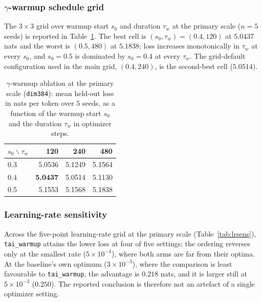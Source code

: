\documentclass[final,5p,times,twocolumn]{elsarticle}
\theoremstyle{remark}
\begin{document}
\subsubsection{$\gamma$-warmup schedule grid}

The $3 \times 3$ grid over warmup start $s_0$ and duration $\tau_w$ at the
primary scale ($n = 5$ seeds) is reported in Table~\ref{tab:warmupgrid}.
The best cell is $(s_0, \tau_w) = (0.4, 120)$ at $5.0437$ nats and the worst
is $(0.5, 480)$ at $5.1838$; loss increases monotonically in $\tau_w$ at every
$s_0$, and $s_0 = 0.5$ is dominated by $s_0 = 0.4$ at every $\tau_w$. The
grid-default configuration used in the main grid, $(0.4, 240)$, is the second-best cell ($5.0514$).

\begin{table}[t]
\centering
\small
\caption{$\gamma$-warmup ablation at the primary scale (\texttt{dim384}): mean
held-out loss in nats per token over $5$ seeds, as a function of the warmup
start $s_0$ and the duration $\tau_w$ in optimizer steps.}
\label{tab:warmupgrid}
\begin{tabular}{@{}lrrr@{}}
\toprule
$s_0 \backslash \tau_w$ & 120 & 240 & 480 \\
\midrule
0.3 & 5.0536 & 5.1249 & 5.1564 \\
0.4 & \textbf{5.0437} & 5.0514 & 5.1130 \\
0.5 & 5.1553 & 5.1568 & 5.1838 \\
\bottomrule
\end{tabular}
\end{table}

\subsubsection{Learning-rate sensitivity}

Across the five-point learning-rate grid at the primary scale
(Table~\ref{tab:lrsens}), \texttt{tai\_warmup} attains the lower loss at four
of five settings; the ordering reverses only at the smallest rate
($5\times 10^{-4}$), where both arms are far from their optima. At the baseline's own
optimum ($3\times 10^{-3}$), where the comparison is least favourable to
\texttt{tai\_warmup}, the advantage is $0.218$ nats, and it is larger still at
$5\times 10^{-3}$ ($0.250$). The reported conclusion is therefore not an artefact of a single
optimizer setting.
\end{document}

